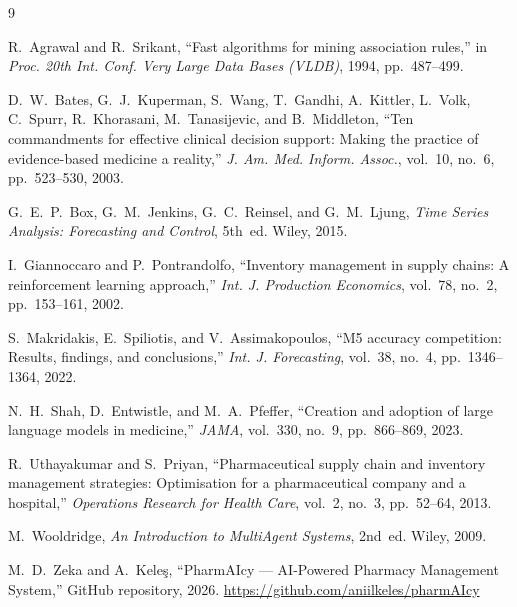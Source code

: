 \documentclass[12pt,a4paper]{article}
\begin{document}
\begin{thebibliography}{9}

R.~Agrawal and R.~Srikant,
``Fast algorithms for mining association rules,''
in \textit{Proc. 20th Int. Conf. Very Large Data Bases (VLDB)}, 1994, pp.~487--499.

D.~W.~Bates, G.~J.~Kuperman, S.~Wang, T.~Gandhi, A.~Kittler, L.~Volk,
C.~Spurr, R.~Khorasani, M.~Tanasijevic, and B.~Middleton,
``Ten commandments for effective clinical decision support: Making the
practice of evidence-based medicine a reality,''
\textit{J. Am. Med. Inform. Assoc.}, vol.~10, no.~6, pp.~523--530, 2003.

G.~E.~P.~Box, G.~M.~Jenkins, G.~C.~Reinsel, and G.~M.~Ljung,
\textit{Time Series Analysis: Forecasting and Control}, 5th~ed.
Wiley, 2015.

I.~Giannoccaro and P.~Pontrandolfo,
``Inventory management in supply chains: A reinforcement learning approach,''
\textit{Int. J. Production Economics}, vol.~78, no.~2, pp.~153--161, 2002.

S.~Makridakis, E.~Spiliotis, and V.~Assimakopoulos,
``M5 accuracy competition: Results, findings, and conclusions,''
\textit{Int. J. Forecasting}, vol.~38, no.~4, pp.~1346--1364, 2022.

N.~H.~Shah, D.~Entwistle, and M.~A.~Pfeffer,
``Creation and adoption of large language models in medicine,''
\textit{JAMA}, vol.~330, no.~9, pp.~866--869, 2023.

R.~Uthayakumar and S.~Priyan,
``Pharmaceutical supply chain and inventory management strategies:
Optimisation for a pharmaceutical company and a hospital,''
\textit{Operations Research for Health Care}, vol.~2, no.~3, pp.~52--64, 2013.

M.~Wooldridge,
\textit{An Introduction to MultiAgent Systems}, 2nd~ed.
Wiley, 2009.

M.~D.~Zeka and A.~Kele\c{s},
``PharmAIcy --- AI-Powered Pharmacy Management System,''
GitHub repository, 2026.
\url{https://github.com/aniilkeles/pharmAIcy}

\end{thebibliography}
\end{document}
